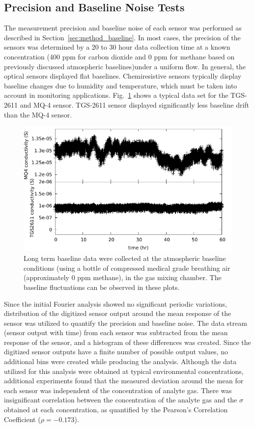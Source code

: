 \documentclass[preprint,sort&compress]{elsarticle}
\begin{document}
		\subsection{Precision and Baseline Noise Tests}
		\label{sec:main_baseline}
		
			The measurement precision and baseline noise of each sensor was performed as described in Section~\ref{sec:method_baseline}.  In most cases, the precision of the sensors was determined by a 20 to 30 hour data collection time at a known concentration (400 ppm for carbon dioxide and 0 ppm for methane based on previously discussed atmospheric baselines)under a uniform flow.  In general, the optical sensors displayed flat baselines. Chemiresistive sensors typically display baseline changes due to humidity and temperature, which must be taken into account in monitoring applications. Fig.~\ref{fig:MQ4TGSbaseline} shows a typical data set for the TGS-2611 and MQ-4 sensor.  TGS-2611 sensor displayed significantly less baseline drift than the MQ-4 sensor.
			
			\begin{figure}[!t]
				\centering
				\includegraphics[width=\columnwidth]{honey5.pdf}
				\caption{Long term baseline data were collected at the atmospheric baseline conditions (using a bottle of compressed medical grade breathing air (approximately 0 ppm methane), in the gas mixing chamber.  The baseline fluctuations can be observed in these plots.}
				\label{fig:MQ4TGSbaseline}
			\end{figure}
			
			Since the initial Fourier analysis showed no significant periodic variations, distribution of the digitized sensor output around the mean response of the sensor was utilized to quantify the precision and baseline noise.  The data stream (sensor output with time) from each sensor was subtracted from the mean response of the sensor, and a histogram of these differences was created. Since the digitized sensor outputs have a finite number of possible output values, no additional bins were created while producing the analysis.  Although the data utilized for this analysis were obtained at typical environmental concentrations, additional experiments found that the measured deviation around the mean for each sensor was independent of the concentration of analyte gas.  There was insignificant correlation between the concentration of the analyte gas and the $\sigma$ obtained at each concentration, as quantified by the Pearson's Correlation Coefficient ($\rho=-0.173$).
			
\end{document}
